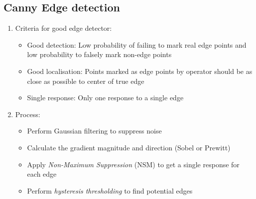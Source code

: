 \documentclass[9pt]{article}
\begin{document}
\begin{multicols*}{2}
        \subsection{Canny Edge detection}
        \begin{enumerate}
            \item Criteria for good edge detector:
            \begin{itemize}
                \item Good detection: Low probability of failing to mark real edge points and low probability to falsely mark non-edge points 
                \item Good localisation: Points marked as edge points by operator should be as close as possible to center of true edge 
                \item Single response: Only one response to a single edge 
            \end{itemize}

            \item Process:
            \begin{itemize}
                \item Perform Gaussian filtering to suppress noise 
                \item Calculate the gradient magnitude and direction (Sobel or Prewitt)
                \item Apply \textit{Non-Maximum Suppression} (NSM) to get a single response for each edge 
                \item Perform \textit{hysteresis thresholding} to find potential edges  
            \end{itemize}
        \end{enumerate}


\end{multicols*}
\end{document}
